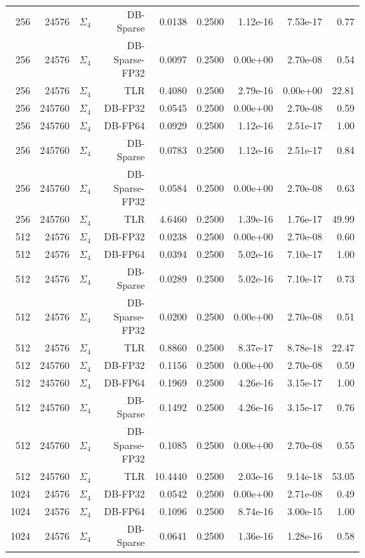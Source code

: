 \begin{tabular}{|r|r|r|r|r|r|r|r|r|}
  256 & 24576 & $\Sigma_4$ & DB-Sparse & 0.0138 & 0.2500 & 1.12e-16 & 7.53e-17 & 0.77 \\
  256 & 24576 & $\Sigma_4$ & DB-Sparse-FP32 & 0.0097 & 0.2500 & 0.00e+00 & 2.70e-08 & 0.54 \\
  256 & 24576 & $\Sigma_4$ & TLR & 0.4080 & 0.2500 & 2.79e-16 & 0.00e+00 & 22.81 \\
  256 & 245760 & $\Sigma_4$ & DB-FP32 & 0.0545 & 0.2500 & 0.00e+00 & 2.70e-08 & 0.59 \\
  256 & 245760 & $\Sigma_4$ & DB-FP64 & 0.0929 & 0.2500 & 1.12e-16 & 2.51e-17 & 1.00 \\
  256 & 245760 & $\Sigma_4$ & DB-Sparse & 0.0783 & 0.2500 & 1.12e-16 & 2.51e-17 & 0.84 \\
  256 & 245760 & $\Sigma_4$ & DB-Sparse-FP32 & 0.0584 & 0.2500 & 0.00e+00 & 2.70e-08 & 0.63 \\
  256 & 245760 & $\Sigma_4$ & TLR & 4.6460 & 0.2500 & 1.39e-16 & 1.76e-17 & 49.99 \\
  512 & 24576 & $\Sigma_4$ & DB-FP32 & 0.0238 & 0.2500 & 0.00e+00 & 2.70e-08 & 0.60 \\
  512 & 24576 & $\Sigma_4$ & DB-FP64 & 0.0394 & 0.2500 & 5.02e-16 & 7.10e-17 & 1.00 \\
  512 & 24576 & $\Sigma_4$ & DB-Sparse & 0.0289 & 0.2500 & 5.02e-16 & 7.10e-17 & 0.73 \\
  512 & 24576 & $\Sigma_4$ & DB-Sparse-FP32 & 0.0200 & 0.2500 & 0.00e+00 & 2.70e-08 & 0.51 \\
  512 & 24576 & $\Sigma_4$ & TLR & 0.8860 & 0.2500 & 8.37e-17 & 8.78e-18 & 22.47 \\
  512 & 245760 & $\Sigma_4$ & DB-FP32 & 0.1156 & 0.2500 & 0.00e+00 & 2.70e-08 & 0.59 \\
  512 & 245760 & $\Sigma_4$ & DB-FP64 & 0.1969 & 0.2500 & 4.26e-16 & 3.15e-17 & 1.00 \\
  512 & 245760 & $\Sigma_4$ & DB-Sparse & 0.1492 & 0.2500 & 4.26e-16 & 3.15e-17 & 0.76 \\
  512 & 245760 & $\Sigma_4$ & DB-Sparse-FP32 & 0.1085 & 0.2500 & 0.00e+00 & 2.70e-08 & 0.55 \\
  512 & 245760 & $\Sigma_4$ & TLR & 10.4440 & 0.2500 & 2.03e-16 & 9.14e-18 & 53.05 \\
  1024 & 24576 & $\Sigma_4$ & DB-FP32 & 0.0542 & 0.2500 & 0.00e+00 & 2.71e-08 & 0.49 \\
  1024 & 24576 & $\Sigma_4$ & DB-FP64 & 0.1096 & 0.2500 & 8.74e-16 & 3.00e-15 & 1.00 \\
  1024 & 24576 & $\Sigma_4$ & DB-Sparse & 0.0641 & 0.2500 & 1.36e-16 & 1.28e-16 & 0.58 \\

\end{tabular}
